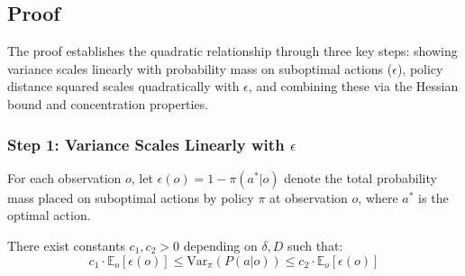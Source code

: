 \subsection{Proof}

The proof establishes the quadratic relationship through three key steps: showing variance scales linearly with probability mass on suboptimal actions ($\epsilon$), policy distance squared scales quadratically with $\epsilon$, and combining these via the Hessian bound and concentration properties.

\subsubsection{Step 1: Variance Scales Linearly with $\epsilon$}

For each observation $o$, let $\epsilon(o) = 1 - \pi(a^*|o)$ denote the total probability mass placed on suboptimal actions by policy $\pi$ at observation $o$, where $a^*$ is the optimal action.

\begin{lemma}
\label{lem:var_linear}
There exist constants $c_1, c_2 > 0$ depending on $\delta, D$ such that:
\begin{equation}
    c_1 \cdot \mathbb{E}_o[\epsilon(o)] \le \text{Var}_{\pi}(P(a|o)) \le c_2 \cdot \mathbb{E}_o[\epsilon(o)]
    \label{eq:var_linear_bound}
\end{equation}
\end{lemma}

